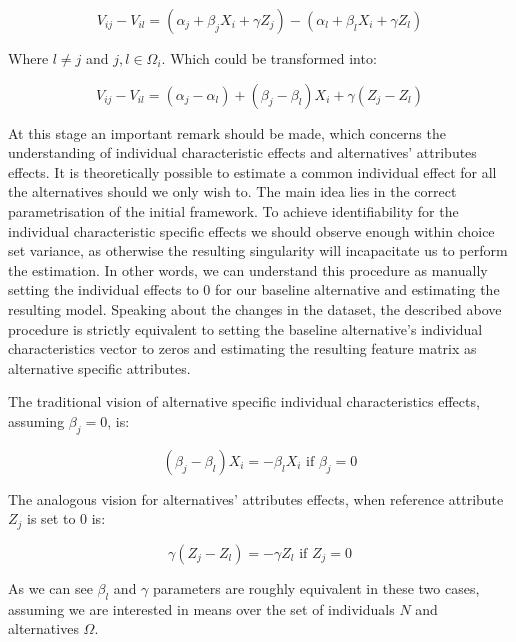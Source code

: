 \documentclass[11pt,]{article}
\begin{document}
\begin{equation}
V_{ij} - V_{il} = (\alpha_j + \beta_j X_i + \gamma Z_j) - (\alpha_l + \beta_l X_i + \gamma Z_l)
\end{equation}

Where \(l \neq j\) and \(j, l \in \Omega_i\). Which could be transformed
into:

\begin{equation}
V_{ij} - V_{il} = (\alpha_j - \alpha_l) + (\beta_j - \beta_l) X_i + \gamma (Z_j - Z_l)
\end{equation}

At this stage an important remark should be made, which concerns the
understanding of individual characteristic effects and alternatives'
attributes effects. It is theoretically possible to estimate a common
individual effect for all the alternatives should we only wish to. The
main idea lies in the correct parametrisation of the initial framework.
To achieve identifiability for the individual characteristic specific
effects we should observe enough within choice set variance, as
otherwise the resulting singularity will incapacitate us to perform the
estimation. In other words, we can understand this procedure as manually
setting the individual effects to 0 for our baseline alternative and
estimating the resulting model. Speaking about the changes in the
dataset, the described above procedure is strictly equivalent to setting
the baseline alternative's individual characteristics vector to zeros
and estimating the resulting feature matrix as alternative specific
attributes.

The traditional vision of alternative specific individual
characteristics effects, assuming \(\beta_j = 0\), is:

\begin{equation}
(\beta_j - \beta_l) X_i = - \beta_l X_i \text{ if } \beta_j = 0
\end{equation}

The analogous vision for alternatives' attributes effects, when
reference attribute \(Z_j\) is set to 0 is:

\begin{equation}
\gamma (Z_j - Z_l) = - \gamma Z_l \text{ if } Z_j = 0
\end{equation}

As we can see \(\beta_l\) and \(\gamma\) parameters are roughly
equivalent in these two cases, assuming we are interested in means over
the set of individuals \(N\) and alternatives \(\Omega\).
\end{document}
